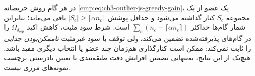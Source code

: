 در هر گام روش حریصانه
\eqref{cmp:eq:ch3-outlier-js-greedy-gain}،
یک عضو از یک مجموعه $S_c$
کنار گذاشته می‌شود و
حداقل پوشش
$|S_c|\ge\lceil\alpha n_c\rceil$
باقی می‌ماند؛ بنابراین شمار
گام‌ها حداکثر
$\sum_c(n_c-\lceil\alpha n_c\rceil)$
است. شرط سود مثبت،
کاهش اکید $\Omega_{\delta_{\mathrm{sep}}}$
را در گام‌های پذیرفته‌شده
تضمین می‌کند، ولی توقف
با سود غیرمثبت
\emph{ناممکن‌بودن جدایی}
را ثابت نمی‌کند:
ممکن است کنارگذاری هم‌زمان
چند عضو یا انتخاب دیگری
مفید باشد. هیچ‌یک از این
نتایج، به‌تنهایی تضمین
افزایش دقت طبقه‌بندی
یا تعیین نادرستی برچسب
نمونه‌های مرزی نیست.

